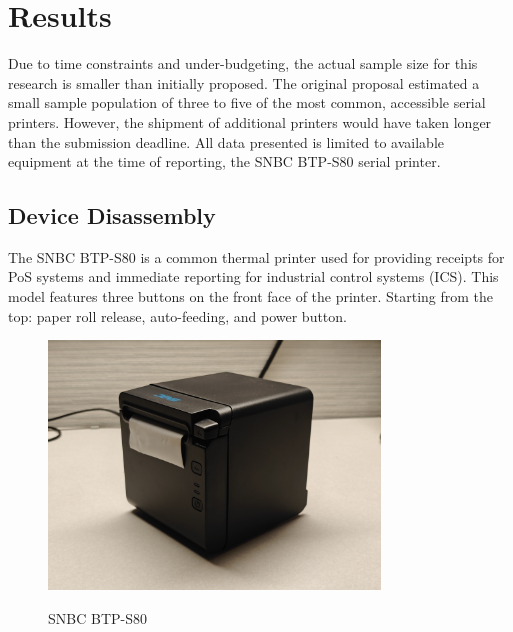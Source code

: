 \section{Results}

Due to time constraints and under-budgeting, the actual sample size for this research is smaller than initially proposed. The original proposal estimated a small sample population of three to five of the most common, accessible serial printers. However, the shipment of additional printers would have taken longer than the submission deadline. All data presented is limited to available equipment at the time of reporting, the SNBC BTP-S80 serial printer.

\subsection{Device Disassembly} \label{devicedisassembly}




The SNBC BTP-S80 is a common thermal printer used for providing receipts for PoS systems and immediate reporting for industrial control systems (ICS). This model features three buttons on the front face of the printer. Starting from the top: paper roll release, auto-feeding, and power button.  

\begin{figure}[ht]
    \centering
    {\includegraphics[width=88mm,scale=0.5]
    {Figures/Teardown/IMG20231204170511.jpg}}
    \caption{SNBC BTP-S80}
    \label{fig:snbc_btp_s80}
\end{figure}

